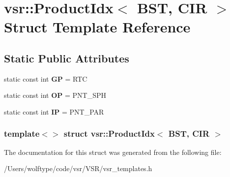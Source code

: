\hypertarget{structvsr_1_1_product_idx_3_01_b_s_t_00_01_c_i_r_01_4}{\section{vsr\-:\-:Product\-Idx$<$ B\-S\-T, C\-I\-R $>$ Struct Template Reference}
\label{structvsr_1_1_product_idx_3_01_b_s_t_00_01_c_i_r_01_4}
}
\subsection*{Static Public Attributes}
\begin{DoxyCompactItemize}
\item 
\hypertarget{structvsr_1_1_product_idx_3_01_b_s_t_00_01_c_i_r_01_4_a9c07917b2f79e1b2e63c0d5c5930a8bd}{static const int {\bfseries G\-P} = R\-T\-C}\label{structvsr_1_1_product_idx_3_01_b_s_t_00_01_c_i_r_01_4_a9c07917b2f79e1b2e63c0d5c5930a8bd}

\item 
\hypertarget{structvsr_1_1_product_idx_3_01_b_s_t_00_01_c_i_r_01_4_a57490214d40f3d92c03070391c6c80a8}{static const int {\bfseries O\-P} = P\-N\-T\-\_\-\-S\-P\-H}\label{structvsr_1_1_product_idx_3_01_b_s_t_00_01_c_i_r_01_4_a57490214d40f3d92c03070391c6c80a8}

\item 
\hypertarget{structvsr_1_1_product_idx_3_01_b_s_t_00_01_c_i_r_01_4_a1d20135bc722932b1b6152d901e06239}{static const int {\bfseries I\-P} = P\-N\-T\-\_\-\-P\-A\-R}\label{structvsr_1_1_product_idx_3_01_b_s_t_00_01_c_i_r_01_4_a1d20135bc722932b1b6152d901e06239}

\end{DoxyCompactItemize}
\subsubsection*{template$<$$>$ struct vsr\-::\-Product\-Idx$<$ B\-S\-T, C\-I\-R $>$}



The documentation for this struct was generated from the following file\-:\begin{DoxyCompactItemize}
\item 
/\-Users/wolftype/code/vsr/\-V\-S\-R/vsr\-\_\-templates.\-h\end{DoxyCompactItemize}
